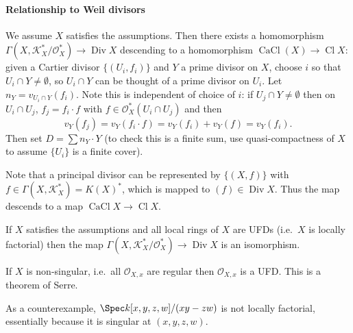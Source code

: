 \documentclass[a4paper]{article}
\newcommand{\sh}[1]{\mathcal{#1}} %
\DeclareMathOperator{\Div}{Div} %
\DeclareMathOperator{\Cl}{Cl} %
\DeclareMathOperator{\CaCl}{CaCl} %
\begin{document}
\paragraph{Relationship to Weil divisors}

We assume \(X\) satisfies the assumptions. Then there exists a homomorphism \(\Gamma(X, \sh K_X^*/\sh O_X^*) \to \Div X\) descending to a homomorphism \(\CaCl(X) \to \Cl X\): given a Cartier divisor \(\{(U_i, f_i)\}\) and \(Y\) a prime divisor on \(X\), choose \(i\) so that \(U_i \cap Y \neq \emptyset\), so \(U_i \cap Y\) can be thought of a prime divisor on \(U_i\). Let \(n_Y = v_{U_i \cap Y}(f_i)\). Note this is independent of choice of \(i\): if \(U_j \cap Y \neq \emptyset\) then on \(U_i \cap U_j\), \(f_j = f_i \cdot f\) with \(f \in \sh O_X^*(U_i \cap U_j)\) and then
\[
  v_Y(f_j) = v_Y(f_i \cdot f) = v_Y(f_i) + v_Y(f) = v_Y(f_i).
\]
Then set \(D = \sum n_Y \cdot Y\) (to check this is a finite sum, use quasi-compactness of \(X\) to assume \(\{U_i\}\) is a finite cover).

Note that a principal divisor can be represented by \(\{(X, f)\}\) with \(f \in \Gamma(X, \sh K_X^*) = K(X)^*\), which is mapped to \((f) \in \Div X\). Thus the map descends to a map \(\CaCl X \to \Cl X\).

\begin{proposition}
  If \(X\) satisfies the assumptions and all local rings of \(X\) are UFDs (i.e.\ \(X\) is locally factorial) then the map \(\Gamma(X, \sh K_X^*/\sh O_X^*) \to \Div X\) is an isomorphism.
\end{proposition}

\begin{remark}
  If \(X\) is non-singular, i.e.\ all \(\sh O_{X, x}\) are regular then \(\sh O_{X, x}\) is a UFD. This is a theorem of Serre.

  As a counterexample, \(\Spec k[x, y, z, w]/(xy - zw)\) is not locally factorial, essentially because it is singular at \((x, y, z, w)\).
\end{remark}
\end{document}
